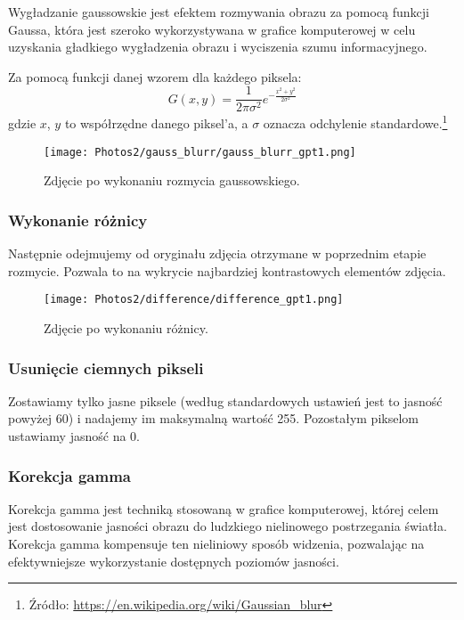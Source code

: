 \documentclass[]{mwart}
\begin{document}
Wygładzanie gaussowskie jest efektem rozmywania obrazu za pomocą funkcji Gaussa,
która jest szeroko wykorzystywana w grafice komputerowej w celu uzyskania gładkiego
wygładzenia obrazu i wyciszenia szumu informacyjnego.

Za pomocą funkcji danej wzorem dla każdego piksela:
\begin{equation}
    G(x, y) = \frac{1}{2 \pi \sigma^2}e^{- \frac{x^2+y^2}{2\sigma^2}}
\end{equation}
gdzie $x$, $y$ to współrzędne danego piksel'a, a $\sigma$ oznacza odchylenie standardowe.\footnote{Źródło: \url{https://en.wikipedia.org/wiki/Gaussian_blur}}

\begin{figure}[H]
    \centering
    \texttt{[image: Photos2/gauss\_blurr/gauss\_blurr\_gpt1.png]}
    \caption{Zdjęcie po wykonaniu rozmycia gaussowskiego.}
\end{figure}

\subsubsection{Wykonanie różnicy}
Następnie odejmujemy od oryginału zdjęcia otrzymane w poprzednim etapie rozmycie.
Pozwala to na wykrycie najbardziej kontrastowych elementów zdjęcia.

\begin{figure}[H]
    \centering
    \texttt{[image: Photos2/difference/difference\_gpt1.png]}
    \caption{Zdjęcie po wykonaniu różnicy.}
\end{figure}

\subsubsection{Usunięcie ciemnych pikseli}
Zostawiamy tylko jasne piksele (według standardowych ustawień jest
to jasność powyżej 60) i nadajemy im maksymalną wartość 255.
Pozostałym pikselom ustawiamy jasność na 0.

\newpage
\subsubsection{Korekcja gamma}

Korekcja gamma jest techniką stosowaną w grafice komputerowej, której celem jest dostosowanie
jasności obrazu do ludzkiego nielinowego postrzegania światła. Korekcja gamma kompensuje ten
nieliniowy sposób widzenia, pozwalając na efektywniejsze wykorzystanie dostępnych poziomów jasności.
\end{document}
